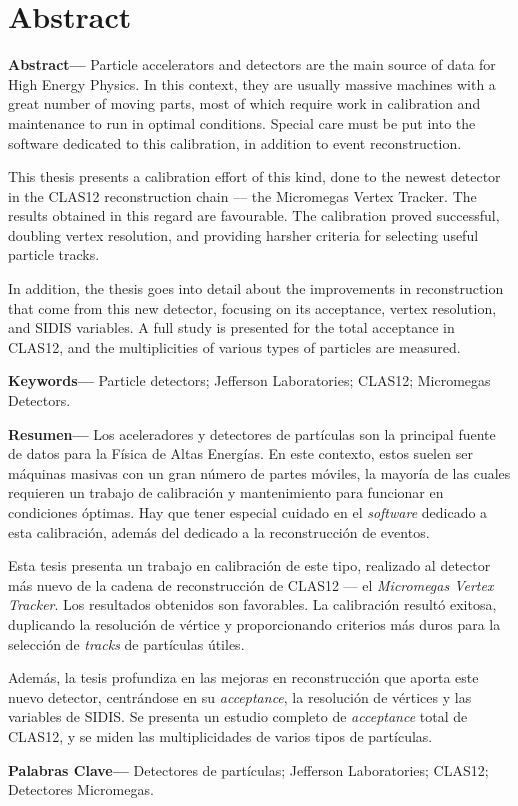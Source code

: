 \section*{Abstract}
    \noindent \textbf{Abstract---}
        Particle accelerators and detectors are the main source of data for High Energy Physics.
        In this context, they are usually massive machines with a great number of moving parts, most of which require work in calibration and maintenance to run in optimal conditions.
        Special care must be put into the software dedicated to this calibration, in addition to event reconstruction.

        This thesis presents a calibration effort of this kind, done to the newest detector in the CLAS12 reconstruction chain --- the Micromegas Vertex Tracker.
        The results obtained in this regard are favourable.
        The calibration proved successful, doubling vertex resolution, and providing harsher criteria for selecting useful particle tracks.

        In addition, the thesis goes into detail about the improvements in reconstruction that come from this new detector, focusing on its acceptance, vertex resolution, and SIDIS variables.
        A full study is presented for the total acceptance in CLAS12, and the multiplicities of various types of particles are measured.

    \noindent \textbf{Keywords---}
        Particle detectors; Jefferson Laboratories; CLAS12; Micromegas Detectors.

    \vspace{1.0cm}

    \noindent \textbf{Resumen---}
        Los aceleradores y detectores de partículas son la principal fuente de datos para la Física de Altas Energías.
        En este contexto, estos suelen ser máquinas masivas con un gran número de partes móviles, la mayoría de las cuales requieren un trabajo de calibración y mantenimiento para funcionar en condiciones óptimas.
        Hay que tener especial cuidado en el \textit{software} dedicado a esta calibración, además del dedicado a la reconstrucción de eventos.

        Esta tesis presenta un trabajo en calibración de este tipo, realizado al detector más nuevo de la cadena de reconstrucción de CLAS12 --- el \textit{Micromegas Vertex Tracker}.
        Los resultados obtenidos son favorables.
        La calibración resultó exitosa, duplicando la resolución de vértice y proporcionando criterios más duros para la selección de \textit{tracks} de partículas útiles.

        Además, la tesis profundiza en las mejoras en reconstrucción que aporta este nuevo detector, centrándose en su \textit{acceptance}, la resolución de vértices y las variables de SIDIS.
        Se presenta un estudio completo de \textit{acceptance} total de CLAS12, y se miden las multiplicidades de varios tipos de partículas.

    \noindent \textbf{Palabras Clave---}
        Detectores de partículas; Jefferson Laboratories; CLAS12; Detectores Micromegas.
